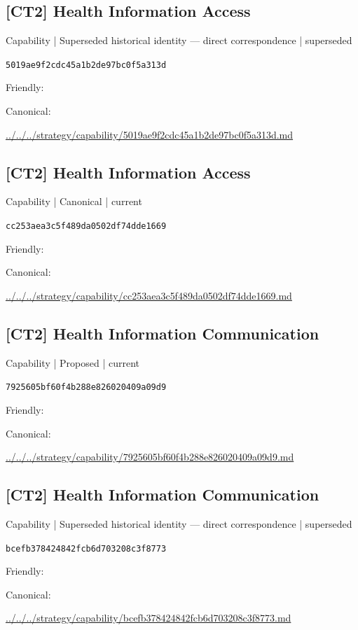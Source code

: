 \documentclass[10pt,a4paper]{article}
\begin{document}
\subsection*{[CT2] Health Information Access}
{\small Capability | Superseded historical identity — direct correspondence | superseded}\par
\texttt{5019ae9f2cdc45a1b2de97bc0f5a313d}\par
Friendly: \par
Canonical: \par
{\footnotesize\url{../../../strategy/capability/5019ae9f2cdc45a1b2de97bc0f5a313d.md}}\par
\subsection*{[CT2] Health Information Access}
{\small Capability | Canonical | current}\par
\texttt{cc253aea3c5f489da0502df74dde1669}\par
Friendly: \par
Canonical: \par
{\footnotesize\url{../../../strategy/capability/cc253aea3c5f489da0502df74dde1669.md}}\par
\subsection*{[CT2] Health Information Communication}
{\small Capability | Proposed | current}\par
\texttt{7925605bf60f4b288e826020409a09d9}\par
Friendly: \par
Canonical: \par
{\footnotesize\url{../../../strategy/capability/7925605bf60f4b288e826020409a09d9.md}}\par
\subsection*{[CT2] Health Information Communication}
{\small Capability | Superseded historical identity — direct correspondence | superseded}\par
\texttt{bcefb378424842fcb6d703208c3f8773}\par
Friendly: \par
Canonical: \par
{\footnotesize\url{../../../strategy/capability/bcefb378424842fcb6d703208c3f8773.md}}\par
\end{document}
